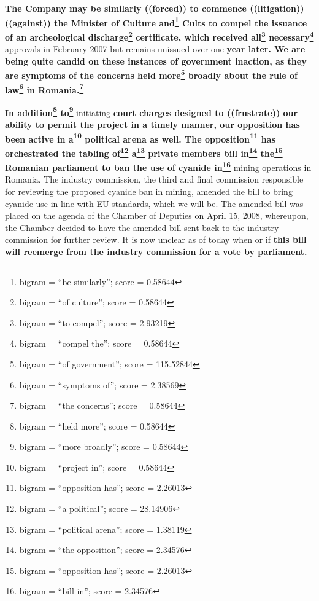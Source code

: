 \documentclass{article}
\begin{document}
 \textbf{The Company may be similarly ((forced)) to commence ((litigation)) ((against)) the Minister of Culture and\footnote{bigram = ``be similarly''; score = 0.58644} Cults to compel the issuance of an archeological discharge\footnote{bigram = ``of culture''; score = 0.58644} certificate, which received all\footnote{bigram = ``to compel''; score = 2.93219} necessary\footnote{bigram = ``compel the''; score = 0.58644}} approvals in February 2007 but remains unissued over one \textbf{year later. We are being quite candid on these instances of government inaction, as they are symptoms of the concerns held more\footnote{bigram = ``of government''; score = 115.52844} broadly about the rule of law\footnote{bigram = ``symptoms of''; score = 2.38569} in Romania.\footnote{bigram = ``the concerns''; score = 0.58644}} 

 \textbf{In addition\footnote{bigram = ``held more''; score = 0.58644} to\footnote{bigram = ``more broadly''; score = 0.58644}} initiating \textbf{court charges designed to ((frustrate)) our ability to permit the project in a timely manner, our opposition has been active in a\footnote{bigram = ``project in''; score = 0.58644} political arena as well. The opposition\footnote{bigram = ``opposition has''; score = 2.26013} has orchestrated the tabling of\footnote{bigram = ``a political''; score = 28.14906} a\footnote{bigram = ``political arena''; score = 1.38119} private members bill in\footnote{bigram = ``the opposition''; score = 2.34576} the\footnote{bigram = ``opposition has''; score = 2.26013} Romanian parliament to ban the use of cyanide in\footnote{bigram = ``bill in''; score = 2.34576}} mining operations in Romania. The industry commission, the third and final commission responsible for reviewing the proposed cyanide ban in mining, amended the bill to bring cyanide use in line with EU standards, which we will be. The amended bill was placed on the agenda of the Chamber of Deputies on April 15, 2008, whereupon, the Chamber decided to have the amended bill sent back to the industry commission for further review. It is now unclear as of today when or if \textbf{this bill will reemerge from the industry commission for a vote by parliament.} 
\end{document}
